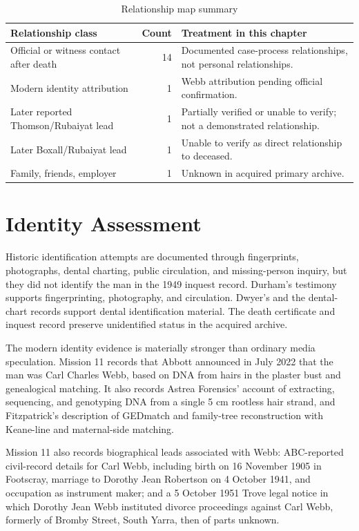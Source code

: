 \begin{table}[htbp]
\centering
\caption{Relationship map summary}
\label{tab:relationship-map-summary}
\begin{tabularx}{\textwidth}{>{\raggedright\arraybackslash}p{}r>{\raggedright\arraybackslash}X}
\toprule
Relationship class & Count & Treatment in this chapter \\
\midrule
Official or witness contact after death & 14 & Documented case-process relationships, not personal relationships. \\
Modern identity attribution & 1 & Webb attribution pending official confirmation. \\
Later reported Thomson/Rubaiyat lead & 1 & Partially verified or unable to verify; not a demonstrated relationship. \\
Later Boxall/Rubaiyat lead & 1 & Unable to verify as direct relationship to deceased. \\
Family, friends, employer & 1 & Unknown in acquired primary archive. \\
\bottomrule
\end{tabularx}
\end{table}

\section{Identity Assessment}

Historic identification attempts are documented through fingerprints, photographs, dental charting, public circulation, and missing-person inquiry, but they did not identify the man in the 1949 inquest record. Durham's testimony supports fingerprinting, photography, and circulation. Dwyer's and the dental-chart records support dental identification material. The death certificate and inquest record preserve unidentified status in the acquired archive.

The modern identity evidence is materially stronger than ordinary media speculation. Mission 11 records that Abbott announced in July 2022 that the man was Carl Charles Webb, based on DNA from hairs in the plaster bust and genealogical matching. It also records Astrea Forensics' account of extracting, sequencing, and genotyping DNA from a single 5 cm rootless hair strand, and Fitzpatrick's description of GEDmatch and family-tree reconstruction with Keane-line and maternal-side matching.

Mission 11 also records biographical leads associated with Webb: ABC-reported civil-record details for Carl Webb, including birth on 16 November 1905 in Footscray, marriage to Dorothy Jean Robertson on 4 October 1941, and occupation as instrument maker; and a 5 October 1951 Trove legal notice in which Dorothy Jean Webb instituted divorce proceedings against Carl Webb, formerly of Bromby Street, South Yarra, then of parts unknown.

